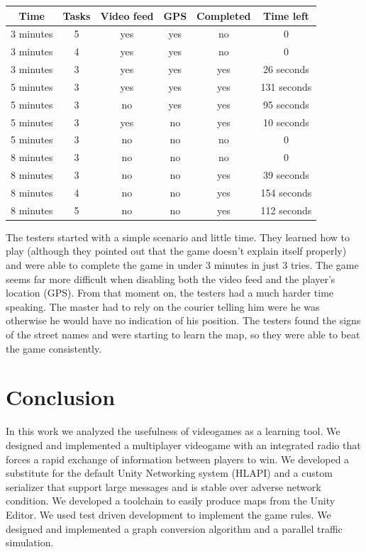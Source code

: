 \documentclass[12pt]{article}
\newcommand\blankpage{%
    \null
    \thispagestyle{empty}%
    \addtocounter{page}{-1}%
    \newpage}
\begin{document}
\begin{center}
\begin{tabular}{ |c|c|c|c||c|c| }
\hline
	Time & Tasks & Video feed & GPS & Completed & Time left \\
\hline
	3 minutes & 5 & yes & yes & no & 0 \\
	3 minutes & 4 & yes & yes & no & 0 \\
	3 minutes & 3 & yes & yes & yes & 26 seconds \\
	5 minutes & 3 & yes & yes & yes & 131 seconds \\
	5 minutes & 3 & no & yes & yes & 95 seconds \\
	5 minutes & 3 & yes & no & yes & 10 seconds \\
	5 minutes & 3 & no & no & no & 0 \\
	8 minutes & 3 & no & no & no & 0 \\
	8 minutes & 3 & no & no & yes & 39 seconds \\
	8 minutes & 4 & no & no & yes & 154 seconds \\
	8 minutes & 5 & no & no & yes & 112 seconds \\
\hline
\end{tabular}
\end{center}

The testers started with a simple scenario and little time. They learned how to play (although they pointed out that the game doesn't explain itself properly) and were able to complete the game in under 3 minutes in just 3 tries. The game seems far more difficult when disabling both the video feed and the player's location (GPS). From that moment on, the testers had a much harder time speaking. The master had to rely on the courier telling him were he was otherwise he would have no indication of his position. The testers found the signs of the street names and were starting to learn the map, so they were able to beat the game consistently.

\afterpage{\blankpage}

\clearpage

\section{Conclusion}
In this work we analyzed the usefulness of videogames as a learning tool. We designed and implemented a multiplayer videogame with an integrated radio that forces a rapid exchange of information between players to win. We developed a substitute for the default Unity Networking system (HLAPI) and a custom serializer that support large messages and is stable over adverse network condition. We developed a toolchain to easily produce maps from the Unity Editor. We used test driven development to implement the game rules. We designed and implemented a graph conversion algorithm and a parallel traffic simulation. \\
\end{document}
